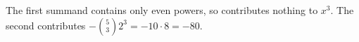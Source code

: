 The first summand contains only even powers, so contributes nothing to $x^3$. The second contributes $-\binom53 2^3=-10\cdot8=\boxed{-80}$.
